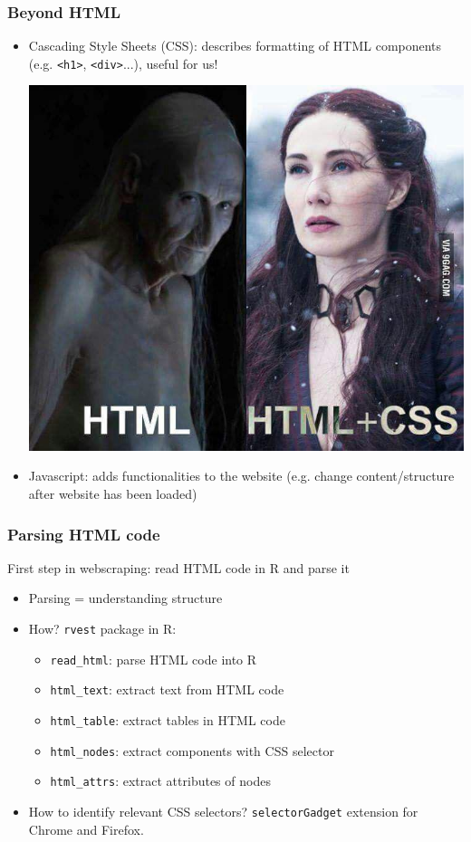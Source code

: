 \documentclass{beamer}
\begin{document}
\begin{frame}[fragile]
	\frametitle{Beyond HTML}
	
	\begin{itemize}
		\item \alert{Cascading Style Sheets} (CSS): describes formatting of HTML components (e.g. \verb|<h1>|, \verb|<div>|...), useful for us!
		
		\begin{center} \includegraphics[width=.5\textwidth]{figures/htmlcss.jpg} \end{center}
		
		\item \alert{Javascript}: adds functionalities to the website (e.g. change content/structure after website has been loaded)
	\end{itemize}
	
\end{frame}

\begin{frame}
	\frametitle{Parsing HTML code}
	
	First step in webscraping: read HTML code in R and \alert{parse it} \pause
	\begin{itemize}[<+->]
		\item Parsing = understanding structure
		\item How? \texttt{rvest} package in R:
		\begin{itemize}
			\item \texttt{read\_html}: parse HTML code into R
			\item \texttt{html\_text}: extract text from HTML code
			\item \texttt{html\_table}: extract tables in HTML code
			\item \texttt{html\_nodes}: extract components with CSS selector 
			\item \texttt{html\_attrs}: extract attributes of nodes
		\end{itemize}
		\item How to identify relevant CSS selectors? \texttt{selectorGadget} extension for Chrome and Firefox.
	\end{itemize}
	
	
\end{frame}
\end{document}
